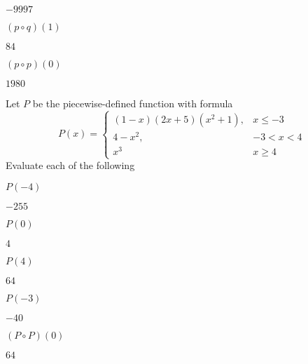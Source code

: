 \begin{exercises}
\begin{problem}
\begin{multicols}{4}
\begin{subproblem}
\begin{shortsolution}
        $-9997$
        \end{shortsolution}
    \end{subproblem}
    \begin{subproblem}
        $(p\circ q)(1)$ 
        \begin{shortsolution}
        $84$
        \end{shortsolution}
    \end{subproblem}
    \begin{subproblem}
        $(p\circ p)(0)$ 
        \begin{shortsolution}
        $1980$
        \end{shortsolution}
    \end{subproblem}
\end{multicols}
\end{problem}
\begin{problem}
Let $P$ be the piecewise-defined function with formula
\[
    P(x)=\begin{cases}
        (1-x)(2x+5)(x^2+1), &   x\leq -3\\
        4-x^2,              &   -3<x < 4\\
        x^3                 &   x\geq 4
    \end{cases}
\]
Evaluate each of the following 
\begin{multicols}{5}
    \begin{subproblem}
        $P(-4)$ 
        \begin{shortsolution}
        $-255$
        \end{shortsolution}
    \end{subproblem}
    \begin{subproblem}
        $P(0)$ 
        \begin{shortsolution}
        $4$
        \end{shortsolution}
    \end{subproblem}
    \begin{subproblem}
        $P(4)$ 
        \begin{shortsolution}
        $64$
        \end{shortsolution}
    \end{subproblem}
    \begin{subproblem}
        $P(-3)$ 
        \begin{shortsolution}
        $-40$
        \end{shortsolution}
    \end{subproblem}
    \begin{subproblem}
        $(P\circ P)(0)$ 
        \begin{shortsolution}
        $64$
        \end{shortsolution}
    \end{subproblem}
\end{multicols}
\end{problem}


\end{exercises}
